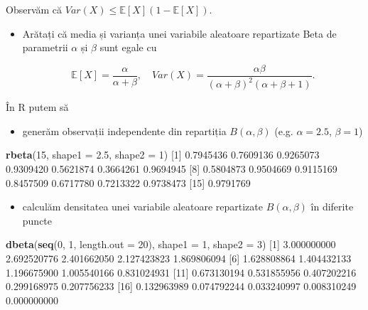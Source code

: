 \documentclass[]{article}
\newenvironment{Shaded}{\begin{snugshade}}{\end{snugshade}}
\newcommand{\KeywordTok}[1]{\textcolor[rgb]{0.13,0.29,0.53}{\textbf{#1}}}
\newcommand{\DataTypeTok}[1]{\textcolor[rgb]{0.13,0.29,0.53}{#1}}
\newcommand{\DecValTok}[1]{\textcolor[rgb]{0.00,0.00,0.81}{#1}}
\newcommand{\FloatTok}[1]{\textcolor[rgb]{0.00,0.00,0.81}{#1}}
\newcommand{\NormalTok}[1]{#1}
\providecommand{\tightlist}{%
  \setlength{\itemsep}{0pt}\setlength{\parskip}{0pt}}
\newenvironment{frshaded*}{%
  \def\FrameCommand{\fboxrule=\FrameRule\fboxsep=\FrameSep \fcolorbox{framecolor}{shadecolor1}}%
  \MakeFramed {\advance\hsize-\width \FrameRestore}}%
{\endMakeFramed}
\newenvironment{rmdblock}[1]
  {\begin{frshaded*}
  \begin{itemize}
  \renewcommand{\labelitemi}{
    \raisebox{-.7\height}[0pt][0pt]{
      {\setkeys{Gin}{width=2em,keepaspectratio}\texttt{[image: images/icons/\#1]}}
    }
  }
  \item
  }
  {
  \end{itemize}
  \end{frshaded*}
  }
\newenvironment{rmdexercise}
  {\begin{rmdblock}{exercise}}
  {\end{rmdblock}}
\begin{document}
Observăm că \(Var(X)\leq\mathbb{E}[X](1-\mathbb{E}[X])\).

\begin{rmdexercise}
Arătați că media și varianța unei variabile aleatoare repartizate Beta
de parametrii \(\alpha\) și \(\beta\) sunt egale cu

\[
  \mathbb{E}[X] = \frac{\alpha}{\alpha+\beta},\quad Var(X) = \frac{\alpha\beta}{(\alpha+\beta)^2(\alpha+\beta+1)}. 
\]
\end{rmdexercise}

În R putem să

\begin{itemize}
\tightlist
\item
  generăm observații independente din repartiția \(B(\alpha, \beta)\)
  (e.g. \(\alpha = 2.5\), \(\beta = 1\))
\end{itemize}

\begin{Shaded}
\begin{Highlighting}[]
\KeywordTok{rbeta}\NormalTok{(}\DecValTok{15}\NormalTok{, }\DataTypeTok{shape1 =} \FloatTok{2.5}\NormalTok{, }\DataTypeTok{shape2 =} \DecValTok{1}\NormalTok{)}
\NormalTok{ [}\DecValTok{1}\NormalTok{] }\FloatTok{0.7945436} \FloatTok{0.7609136} \FloatTok{0.9265073} \FloatTok{0.9309420} \FloatTok{0.5621874} \FloatTok{0.3664261} \FloatTok{0.9694945}
\NormalTok{ [}\DecValTok{8}\NormalTok{] }\FloatTok{0.5804873} \FloatTok{0.9504669} \FloatTok{0.9115169} \FloatTok{0.8457509} \FloatTok{0.6717780} \FloatTok{0.7213322} \FloatTok{0.9738473}
\NormalTok{[}\DecValTok{15}\NormalTok{] }\FloatTok{0.9791769}
\end{Highlighting}
\end{Shaded}

\begin{itemize}
\tightlist
\item
  calculăm densitatea unei variabile aleatoare repartizate
  \(B(\alpha, \beta)\) în diferite puncte
\end{itemize}

\begin{Shaded}
\begin{Highlighting}[]
\KeywordTok{dbeta}\NormalTok{(}\KeywordTok{seq}\NormalTok{(}\DecValTok{0}\NormalTok{, }\DecValTok{1}\NormalTok{, }\DataTypeTok{length.out =} \DecValTok{20}\NormalTok{), }\DataTypeTok{shape1 =} \DecValTok{1}\NormalTok{, }\DataTypeTok{shape2 =} \DecValTok{3}\NormalTok{)}
\NormalTok{ [}\DecValTok{1}\NormalTok{] }\FloatTok{3.000000000} \FloatTok{2.692520776} \FloatTok{2.401662050} \FloatTok{2.127423823} \FloatTok{1.869806094}
\NormalTok{ [}\DecValTok{6}\NormalTok{] }\FloatTok{1.628808864} \FloatTok{1.404432133} \FloatTok{1.196675900} \FloatTok{1.005540166} \FloatTok{0.831024931}
\NormalTok{[}\DecValTok{11}\NormalTok{] }\FloatTok{0.673130194} \FloatTok{0.531855956} \FloatTok{0.407202216} \FloatTok{0.299168975} \FloatTok{0.207756233}
\NormalTok{[}\DecValTok{16}\NormalTok{] }\FloatTok{0.132963989} \FloatTok{0.074792244} \FloatTok{0.033240997} \FloatTok{0.008310249} \FloatTok{0.000000000}
\end{Highlighting}
\end{Shaded}
\end{document}
